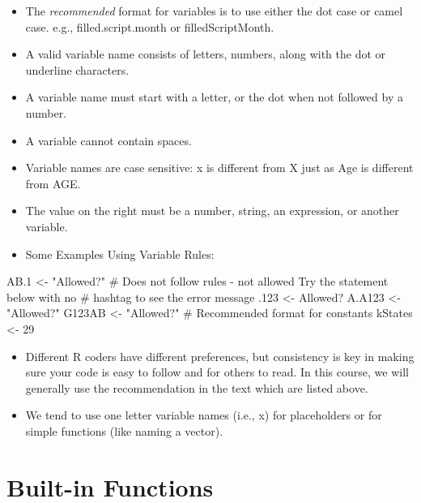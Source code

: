 \documentclass[
  letterpaper,
  DIV=11,
  numbers=noendperiod]{scrreprt}
\newenvironment{Shaded}{\begin{snugshade}}{\end{snugshade}}
\newcommand{\CommentTok}[1]{\textcolor[rgb]{0.37,0.37,0.37}{#1}}
\newcommand{\DecValTok}[1]{\textcolor[rgb]{0.68,0.00,0.00}{#1}}
\newcommand{\FloatTok}[1]{\textcolor[rgb]{0.68,0.00,0.00}{#1}}
\newcommand{\NormalTok}[1]{\textcolor[rgb]{0.00,0.23,0.31}{#1}}
\newcommand{\OtherTok}[1]{\textcolor[rgb]{0.00,0.23,0.31}{#1}}
\newcommand{\StringTok}[1]{\textcolor[rgb]{0.13,0.47,0.30}{#1}}
\providecommand{\tightlist}{%
  \setlength{\itemsep}{0pt}\setlength{\parskip}{0pt}}\usepackage{longtable,booktabs,array}
\begin{document}
\begin{itemize}
\item
  The \emph{recommended} format for variables is to use either the dot
  case or camel case. e.g., filled.script.month or filledScriptMonth.
\item
  A valid variable name consists of letters, numbers, along with the dot
  or underline characters.
\item
  A variable name must start with a letter, or the dot when not followed
  by a number.
\item
  A variable cannot contain spaces.
\item
  Variable names are case sensitive: x is different from X just as Age
  is different from AGE.
\item
  The value on the right must be a number, string, an expression, or
  another variable.
\item
  Some Examples Using Variable Rules:
\end{itemize}

\begin{Shaded}
\begin{Highlighting}[]
\NormalTok{AB}\FloatTok{.1} \OtherTok{\textless{}{-}} \StringTok{"Allowed?"}
\CommentTok{\# Does not follow rules {-} not allowed Try the statement below with no}
\CommentTok{\# hashtag to see the error message .123 \textless{}{-} \textquotesingle{}Allowed?\textquotesingle{}}
\NormalTok{A.A123 }\OtherTok{\textless{}{-}} \StringTok{"Allowed?"}
\NormalTok{G123AB }\OtherTok{\textless{}{-}} \StringTok{"Allowed?"}
\CommentTok{\# Recommended format for constants}
\NormalTok{kStates }\OtherTok{\textless{}{-}} \DecValTok{29}
\end{Highlighting}
\end{Shaded}

\begin{itemize}
\tightlist
\item
  Different R coders have different preferences, but consistency is key
  in making sure your code is easy to follow and for others to read. In
  this course, we will generally use the recommendation in the text
  which are listed above.
\item
  We tend to use one letter variable names (i.e., x) for placeholders or
  for simple functions (like naming a vector).
\end{itemize}


\chapter{Built-in Functions}\label{built-in-functions}
\end{document}
